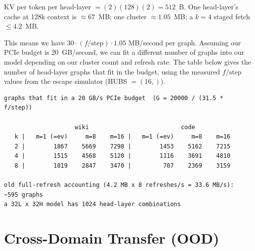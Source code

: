 \documentclass[11pt,a4paper]{article}
\begin{document}
KV per token per head-layer $= (2)(128)(2) = 512$~B. One head-layer's cache at 128k context is $\approx 67$~MB; one cluster $\approx 1.05$~MB; a $k=4$ staged fetch $\leq 4.2$~MB.

This means we have $30 \cdot (f/\text{step}) \cdot 1.05$ MB/second per graph. Assuming our PCIe budget is 20~GB/second, we can fit a different number of graphs into our model depending on our cluster count and refresh rate. The table below gives the number of head-layer graphs that fit in the budget, using the measured $f/\text{step}$ values from the escape simulator (HUBS $=(16,)$).

{\footnotesize
\begin{verbatim}
graphs that fit in a 20 GB/s PCIe budget  (G = 20000 / (31.5 * f/step))

                    wiki                          code
   k |   m=1 (=ev)     m=8    m=16 |   m=1 (=ev)     m=8    m=16
   2 |        1867    5669    7298 |        1453    5162    7215
   4 |        1515    4568    5120 |        1116    3691    4810
   8 |        1019    2847    3470 |         707    2369    3159

old full-refresh accounting (4.2 MB x 8 refreshes/s = 33.6 MB/s):  ~595 graphs
a 32L x 32H model has 1024 head-layer combinations
\end{verbatim}
}



\section{Cross-Domain Transfer (OOD)}\label{sec:ood}
%
%
\end{document}
